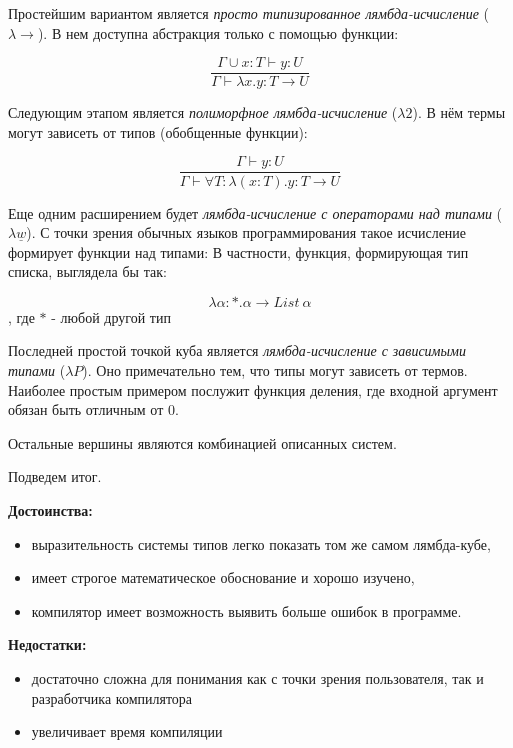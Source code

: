 Простейшим вариантом является \textit{просто типизированное лямбда-исчисление} ($\lambda \to$).
В нем доступна абстракция только с помощью функции:

\begin{equation}
    \label{eq:STLC}
    \frac{\Gamma \cup x: T \vdash y: U}{\Gamma \vdash \lambda x.y: T \to U}
\end{equation}

Следующим этапом является \textit{полиморфное лямбда-исчисление} ($\lambda 2$).
В нём термы могут зависеть от типов (обобщенные функции):

\begin{equation}
    \label{eq:2TLC}
    \frac{\Gamma \vdash y: U}{\Gamma \vdash \forall T: \lambda (x: T).y: T \to U}
\end{equation}

Еще одним расширением будет \textit{лямбда-исчисление с операторами над типами} ($\lambda \underline{w}$).
С точки зрения обычных языков программирования такое исчисление формирует функции над типами:
В частности, функция, формирующая тип списка, выглядела бы так:

\begin{equation}
    \label{eq:WTLC}
    \lambda \alpha: *. \alpha \to List ~\alpha
\end{equation}, где $*$ - любой другой тип

Последней простой точкой куба является \textit{лямбда-исчисление с зависимыми типами} ($\lambda P$).
Оно примечательно тем, что типы могут зависеть от термов.
Наиболее простым примером послужит функция деления, где входной аргумент обязан быть отличным от $0$.

Остальные вершины являются комбинацией описанных систем.

Подведем итог.

\textbf{Достоинства:}
\begin{itemize}
    \item выразительность системы типов легко показать том же самом лямбда-кубе,
    \item имеет строгое математическое обоснование и хорошо изучено,
    \item компилятор имеет возможность выявить больше ошибок в программе.
\end{itemize}

\textbf{Недостатки:}
\begin{itemize}
    \item достаточно сложна для понимания как с точки зрения пользователя, так и разработчика компилятора
    \item увеличивает время компиляции
\end{itemize}

